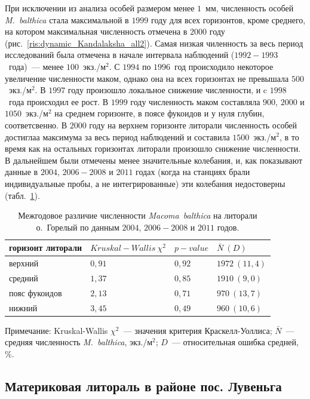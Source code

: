 При исключении из анализа особей размером менее $1$~мм, численность особей {\it M.~balthica} стала максимальной в $1999$ году для всех горизонтов, кроме среднего, на котором максимальная численность отмечена в $2000$ году (рис.~\ref{ris:dynamic_Kandalaksha_all2}).
Самая низкая чиленность за весь период исследований была отмечена в начале интервала наблюдений ($1992-1993$~года)~--- менее $100$~экз./м$^2$.
С $1994$ по $1996$~год происходило некоторое увеличение численности маком, однако она на всех горизонтах не превышала $500$~экз./м$^2$.
В $1997$ году произошло локальное снижение численности, и c $1998$~года происходил ее рост. 
В $1999$ году численность маком составляла $900$, $2000$ и $1050$~экз./м$^2$ на среднем горизонте, в поясе фукоидов и у нуля глубин, соответсвенно.
В $2000$ году на верхнем горизонте литорали численность особей достиглаа максимума за весь период наблюдений и составила  $1500$~экз./м$^2$, в то время как на остальных горизонтах литорали произошло снижение численности.
В дальнейшем были отмечены менее значительные колебания, и, как показывают данные в $2004$, $2006 - 2008$ и $2011$ годах (когда на станциях брали индивидуальные пробы, а не интегрированные) эти колебания недостоверны (табл.~\ref{tab:Goreliy_N2_Kruskal}).

	\begin{table}[p]
	\begin{tabularx}{\textwidth}{|*{4}{X|}} \hline
	горизонт литорали & $Kruskal-Wallis\ \chi^2$ & $p-value$ & $\bar{N} ~ (D)$ \\ 
	\hline
	верхний & $0,91$ & $0,92$ & $1972~(11,4)$ \\
	\hline
	средний & $1,37$ & $0,85$ & $1910~(9,0)$\\
	\hline
	пояс фукоидов & $2,13$ & $0,71$ & $970~(13,7)$ \\
	\hline
	нижний & $3,45$ & $0,49$ & $960~(10,6)$ \\
	\hline
	\end{tabularx}
	{\footnotesize Примечание: Kruskal-Wallis $\chi^2$~--- значения критерия Краскелл-Уоллиса; $\bar{N}$~--- средняя численность {\it 	M.~balthica}, экз./м$^2$; $D$~--- относительная ошибка средней, \%.}
	\caption{Межгодовое различие численности {\it Macoma~balthica} на литорали о.~Горелый по данным $2004$, $2006 - 2008$ и $2011$ годов.}
	\label{tab:Goreliy_N2_Kruskal}
	\end{table}


		\subsection{Материковая литораль в районе пос. Лувеньга}

